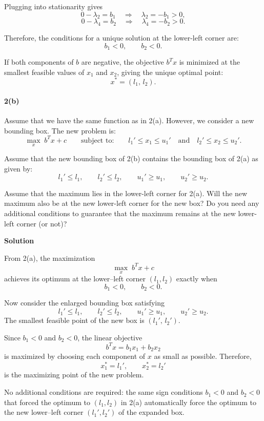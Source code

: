 \documentclass[11pt]{article}
\begin{document}
	Plugging into stationarity gives
	\[
	0 - \lambda_2 = b_1 \quad \Rightarrow \quad \lambda_2 = -b_1 > 0,
	\]
	\[
	0 - \lambda_4 = b_2 \quad \Rightarrow \quad \lambda_4 = -b_2 > 0.
	\]
	
	Therefore, the conditions for a unique solution at the lower-left corner are:
	\[
	b_1 < 0, \qquad b_2 < 0.
	\]
	
	If both components of $b$ are negative, the objective $b^T x$ is minimized at the smallest feasible values of $x_1$ and $x_2$, giving the unique optimal point:
	\[
	x^\ast = (l_1,\, l_2).
	\]
	
	\paragraph{2(b)}  
	Assume that we have the same function as in 2(a). However, we consider a new bounding box.  
	The new problem is:
	\[
	\max_{x} \; b^T x + c \qquad \text{subject to:} \qquad l_1' \le x_1 \le u_1' \quad \text{and} \quad l_2' \le x_2 \le u_2'. \tag{2}
	\]
	
	Assume that the new bounding box of 2(b) contains the bounding box of 2(a) as given by:
	\[
	l_1' \le l_1, \qquad l_2' \le l_2, \qquad u_1' \ge u_1, \qquad u_2' \ge u_2. \tag{3}
	\]
	
	Assume that the maximum lies in the lower-left corner for 2(a).  
	Will the new maximum also be at the new lower-left corner for the new box?  
	Do you need any additional conditions to guarantee that the maximum remains at the new lower-left corner (or not)?
	
	\noindent\textbf{Solution}
	
	From 2(a), the maximization
	\[
	\max_x \; b^T x + c
	\]
	achieves its optimum at the lower--left corner $(l_1, l_2)$ exactly when
	\[
	b_1 < 0, \qquad b_2 < 0.
	\]
	
	Now consider the enlarged bounding box satisfying
	\[
	l_1' \le l_1, \qquad l_2' \le l_2, \qquad
	u_1' \ge u_1, \qquad u_2' \ge u_2.
	\]
	The smallest feasible point of the new box is $(l_1',\, l_2')$.
	
	Since $b_1 < 0$ and $b_2 < 0$, the linear objective
	\[
	b^T x = b_1 x_1 + b_2 x_2
	\]
	is maximized by choosing each component of $x$ as small as possible.  
	Therefore,
	\[
	x_1^\ast = l_1', \qquad x_2^\ast = l_2'
	\]
	is the maximizing point of the new problem.
	
	No additional conditions are required:  
	the same sign conditions $b_1 < 0$ and $b_2 < 0$ that forced the optimum to $(l_1,l_2)$ in 2(a) automatically force the optimum to the new lower--left corner $(l_1',l_2')$ of the expanded box.
	
\end{document}
